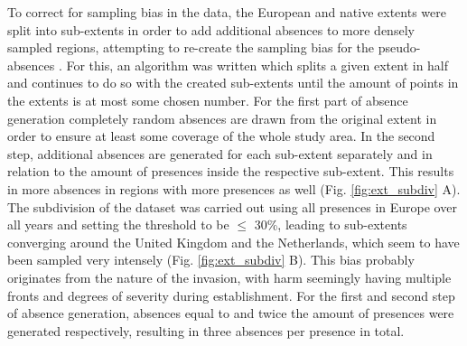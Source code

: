 \documentclass[12pt,a4paper]{article}
\begin{document}
To correct for sampling bias in the data, the European and native extents were split into sub-extents in order to add additional absences to more densely sampled regions, attempting to re-create the sampling bias for the pseudo-absences \autocite{phillips2009samplebias}.
For this, an algorithm was written which splits a given extent in half and continues to do so with the created sub-extents until the amount of points in the extents is at most some chosen number.
For the first part of absence generation completely random absences are drawn from the original extent in order to ensure at least some coverage of the whole study area.
In the second step, additional absences are generated for each sub-extent separately and in relation to the amount of presences inside the respective sub-extent.
This results in more absences in regions with more presences as well (Fig. \ref{fig:ext_subdiv} A).
The subdivision of the dataset was carried out using all presences in Europe over all years and setting the threshold to be $\leq$ 30\%, leading to sub-extents converging around the United Kingdom and the Netherlands, which seem to have been sampled very intensely (Fig. \ref{fig:ext_subdiv} B).
This bias probably originates from the nature of the invasion, with \gls{harm} seemingly having multiple fronts and degrees of severity during establishment.
For the first and second step of absence generation, absences equal to and twice the amount of presences were generated respectively, resulting in three absences per presence in total.
\end{document}
